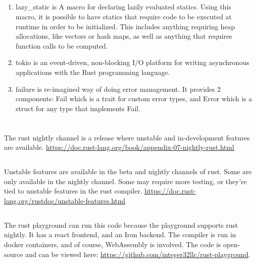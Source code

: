 \documentclass[letterpaper]{article}
\begin{document}
\subsection{}
\begin{enumerate}
  \item lazy\_static is A macro for declaring lazily evaluated statics.
Using this macro, it is possible to have statics that require code to be executed at runtime in order to be initialized. This includes anything requiring heap allocations, like vectors or hash maps, as well as anything that requires function calls to be computed.
\item tokio is an event-driven, non-blocking I/O platform for writing asynchronous applications with the Rust programming language. 
\item failure is re-imagined way of doing error management. It provides 2
  components: Fail which is a trait for custom error types, and Error which is a
  struct for any type that implements Fail. 
  \end{enumerate}

  \section{}
  \subsection{}
  The rust nightly channel is a release where unstable and in-development
  features are available.
  \url{https://doc.rust-lang.org/book/appendix-07-nightly-rust.html}
  
  \subsection{}
  Unstable features are available in the beta and nightly channels of rust. Some
  are only available in the nightly channel. Some may require more testing,
  or they're tied to unstable features in the rust compiler. 
  \url{https://doc.rust-lang.org/rustdoc/unstable-features.html}

  \subsection{}
  The rust playground can run this code because the playground supports rust
  nightly. It has a react frontend, and an Iron backend. The compiler is run in
  docker containers, and of course, WebAssembly is involved. The code is
  open-source and can be viewed here:
  \url{https://github.com/integer32llc/rust-playground}.
\end{document}
